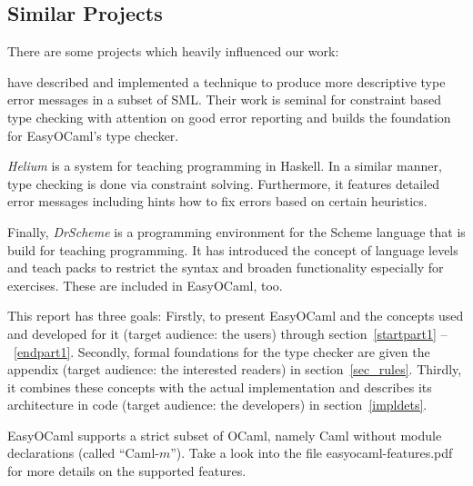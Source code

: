 \subsection{Similar Projects}
\label{hd001002}
There are some projects which heavily influenced our work:

\citet{Haack_abstracttype} have described and implemented a technique 
to produce more descriptive type error messages in a subset of SML.  
Their work is seminal for constraint based type checking with attention 
on good error reporting and builds the foundation for EasyOCaml's type 
checker.

\emph{Helium} \citep{helium-hw03} is a system for teaching programming 
in Haskell. In a similar manner, type checking is done via constraint 
solving. Furthermore, it features detailed error messages including 
hints how to fix errors based on certain heuristics.

Finally, \emph{DrScheme} \citep{Felleisen98thedrscheme} is a programming 
environment for the Scheme language that is build for teaching 
programming.  It has introduced the concept of language levels and teach 
packs to restrict the syntax and broaden functionality especially for 
exercises. These are included in EasyOCaml, too.

This report has three goals: Firstly, to present EasyOCaml and the 
concepts used and developed for it (target audience: the users) through 
section~\ref{startpart1} --~\ref{endpart1}.
Secondly, formal foundations for the type checker are given the appendix (target
audience: the interested readers) in section~\ref{sec_rules}.
Thirdly, it combines these concepts with the actual implementation and
describes its architecture in code (target audience: the developers) in
section~\ref{impldets}.

\label{hd001001}
EasyOCaml supports a strict subset of OCaml, namely Caml without module 
declarations (called ``Caml-$m$''). Take a look into the file 
easyocaml-features.pdf for more details on the supported features. 
\what

